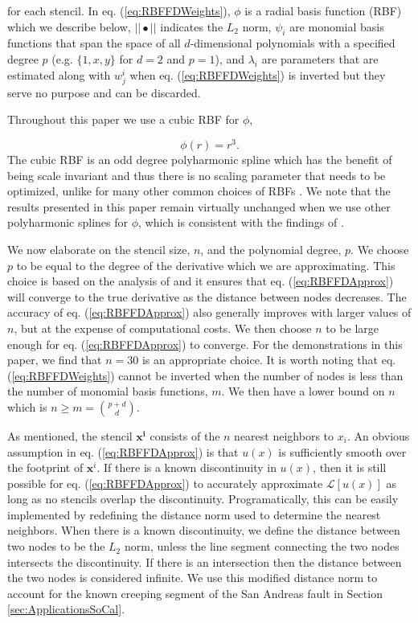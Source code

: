 \documentclass[10pt,a4paper]{article}
\begin{document}
for each stencil. In eq. (\ref{eq:RBFFDWeights}), $\phi$ is a radial basis function (RBF) which we describe below, $||\bullet||$ indicates the $L_2$ norm, $\psi_i$ are monomial basis functions that span the space of all $d$-dimensional polynomials with a specified degree $p$ (e.g. $\{1, x, y\}$ for $d=2$ and $p=1$), and $\lambda_i$ are parameters that are estimated along with $w^i_j$ when eq. (\ref{eq:RBFFDWeights}) is inverted but they serve no purpose and can be discarded. 

Throughout this paper we use a cubic RBF for $\phi$,

\begin{equation}\label{eq:Cubic}
\phi(r) = r^3.
\end{equation}
The cubic RBF is an odd degree polyharmonic spline which has the benefit of being scale invariant and thus there is no scaling parameter that needs to be optimized, unlike for many other common choices of RBFs \citep[e.g.][]{Larsson2003}.  We note that the results presented in this paper remain virtually unchanged when we use other polyharmonic splines for $\phi$, which is consistent with the findings of \citet{Flyer2016}. 

We now elaborate on the stencil size, $n$, and the polynomial degree, $p$.  We choose $p$ to be equal to the degree of the derivative which we are approximating. This choice is based on the analysis of \citet{Flyer2016} and it ensures that eq. (\ref{eq:RBFFDApprox}) will converge to the true derivative as the distance between nodes decreases. The accuracy of eq. (\ref{eq:RBFFDApprox}) also generally improves with larger values of $n$, but at the expense of computational costs. We then choose $n$ to be large enough for eq. (\ref{eq:RBFFDApprox}) to converge. For the demonstrations in this paper, we find that $n=30$ is an appropriate choice.  It is worth noting that eq. (\ref{eq:RBFFDWeights}) cannot be inverted when the number of nodes is less than the number of monomial basis functions, $m$.  We then have a lower bound on $n$ which is $n \ge m = {{p+d}\choose{d}}$.   

As mentioned, the stencil $\mathbf{x^i}$ consists of the $n$ nearest neighbors to $x_i$.  An obvious assumption in eq. (\ref{eq:RBFFDApprox}) is that $u(x)$ is sufficiently smooth over the footprint of $\mathbf{x}^i$. If there is a known discontinuity in $u(x)$, then it is still possible for eq. (\ref{eq:RBFFDApprox}) to accurately approximate $\mathcal{L}[u(x)]$ as long as no stencils overlap the discontinuity. Programatically, this can be easily implemented by redefining the distance norm used to determine the nearest neighbors.  When there is a known discontinuity, we define the distance between two nodes to be the $L_2$ norm, unless the line segment connecting the two nodes intersects the discontinuity. If there is an intersection then the distance between the two nodes is considered infinite. We use this modified distance norm to account for the known creeping segment of the San Andreas fault in Section \ref{sec:ApplicationsSoCal}.  
\end{document}
